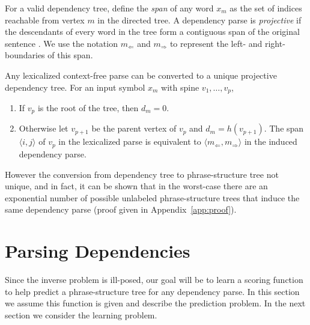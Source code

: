 \documentclass[11pt,letterpaper]{article}
\newcommand{\Left}[1]{#1_{\Leftarrow}}
\newcommand{\Right}[1]{#1_{\Rightarrow}}
\newcommand{\Span}[1]{\langle #1 \rangle}
\begin{document}
For a valid dependency tree, define the \textit{span} of any word $x_m$ as the set of indices reachable from vertex $m$ in the directed tree. A dependency parse is \textit{projective} if the descendants of every word in the tree form a contiguous span of the original sentence \cite{}. We use the notation $\Left{m}$ and $\Right{m}$ to represent the left- and
right-boundaries of this span.


Any lexicalized context-free parse can be converted to a unique projective dependency tree.
For an input symbol $x_m$ with spine $v_1, \ldots, v_p$,

\begin{enumerate}
\item If $v_p$ is the root of the tree,
then $d_m = 0$.
\item Otherwise let $v_{p+1}$ be the parent vertex of
$v_p$ and $d_m = h(v_{p+1})$. The span $\Span{i, j}$ of $v_p$ in the lexicalized parse is equivalent to $\Span{\Left{m}, \Right{m}}$
in the induced dependency parse.
\end{enumerate}


However the conversion from dependency tree to phrase-structure tree not unique, and in fact, it can be shown that in the worst-case there are an
exponential number of possible unlabeled phrase-structure trees that induce the same dependency parse (proof given in Appendix~\ref{app:proof}).


\section{Parsing Dependencies}

Since the inverse problem is ill-posed, our goal will
be to learn a scoring function to help predict a
phrase-structure tree for any dependency parse. In
this section we assume this function is given and describe
the prediction problem. In the next section we consider
the learning problem.
\end{document}
